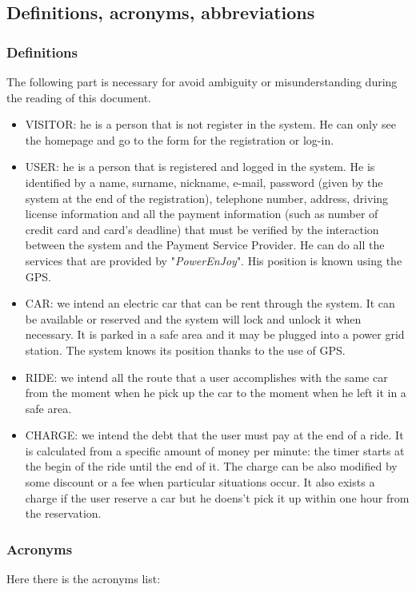 \subsection{Definitions, acronyms, abbreviations} \label{subsec:def-ac-ab}

\subsubsection{Definitions} \label{def}
The following part is necessary for avoid ambiguity or misunderstanding during the reading of this document. 
\begin{itemize}
\item VISITOR: he is a person that is not register in the system. He can only see the homepage and go to the form for the registration or log-in.
\item USER: he is a person that is registered and logged in the system. He is identified by a name, surname, nickname, e-mail, password (given by the system at the end of the registration), telephone number, address, driving license information and all the payment information (such as number of credit card and card's deadline) that must be verified by the interaction between the system and the Payment Service Provider. He can do all the services that are provided by "\emph{PowerEnJoy}". His position is known using the GPS.
\item CAR: we intend an electric car that can be rent through the system. It can be available or reserved and the system will lock and unlock it when necessary. It is parked in a safe area and it may be plugged into a power grid station. The system knows its position thanks to the use of GPS.
\item RIDE: we intend all the route that a user accomplishes with the same car from the moment when he pick up the car to the moment when he left it in a safe area.   
\item CHARGE: we intend the debt that the user must pay at the end of a ride. It is calculated from a specific amount of money per minute: the timer starts at the begin of the ride until the end of it. The charge can be also modified by some discount or a fee when particular situations occur. It also exists a charge if the user reserve a car but he doens't pick it up within one hour from the reservation.  

\end{itemize}

\subsubsection{Acronyms} \label{acr}
Here there is the acronyms list:


